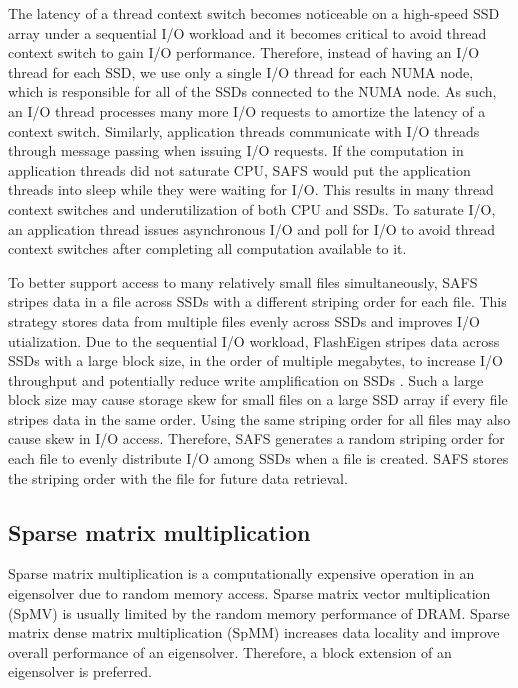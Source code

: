 The latency of a thread context switch becomes noticeable on a high-speed SSD
array under a sequential I/O workload and it becomes critical to avoid thread
context switch to gain I/O performance. Therefore, instead of having an I/O
thread for each SSD, we use only a single I/O thread for each NUMA node, which
is responsible for all of the SSDs connected to the NUMA node. As such, an I/O
thread processes many more I/O requests to amortize the latency of a context
switch. Similarly, application threads communicate with I/O threads through
message passing when issuing I/O requests. If the computation in application
threads did not saturate CPU, SAFS would put the application threads into
sleep while they were waiting for I/O. This results in many thread context
switches and underutilization of both CPU and SSDs. To saturate I/O,
an application thread issues asynchronous I/O and poll for I/O to avoid thread
context switches after completing all computation available to it.

To better support access to many relatively small files simultaneously, SAFS
stripes data in a file across SSDs with a different striping order for each file.
This strategy stores data from multiple files evenly across SSDs and improves
I/O utialization. Due to the sequential I/O workload, FlashEigen stripes data
across SSDs with a large block size, in the order of multiple
megabytes, to increase I/O throughput and potentially reduce write amplification
on SSDs \cite{}. Such a large block size may cause storage skew for small files
on a large SSD array if every file stripes data in the same order. Using
the same striping order for all files may also cause skew in I/O access.
Therefore, SAFS generates a random striping order for each file to evenly
distribute I/O among SSDs when a file is created. SAFS stores the striping
order with the file for future data retrieval.

\subsection{Sparse matrix multiplication} \label{spmm}
Sparse matrix multiplication is a computationally expensive
operation in an eigensolver due to random memory access. Sparse matrix vector
multiplication (SpMV) is usually limited by the random memory performance of
DRAM. Sparse matrix dense matrix multiplication (SpMM) increases data locality
and improve overall performance of an eigensolver. Therefore, a block extension
of an eigensolver is preferred.

